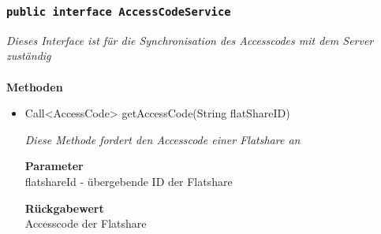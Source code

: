 	\subsubsection{\texttt{public interface AccessCodeService}}
\textit{Dieses Interface ist für die Synchronisation des Accesscodes mit dem Server zuständig }\\
\\
	\textbf{Methoden} \\
		\begin{itemize}
		\item{Call<AccessCode> getAccessCode(String flatShareID)}

		\textit{Diese Methode fordert den Accesscode einer Flatshare an}

		\textbf{Parameter} \\
	flatshareId - übergebende ID der Flatshare

		\textbf{Rückgabewert} \\
	Accesscode der Flatshare


	 \end{itemize}

